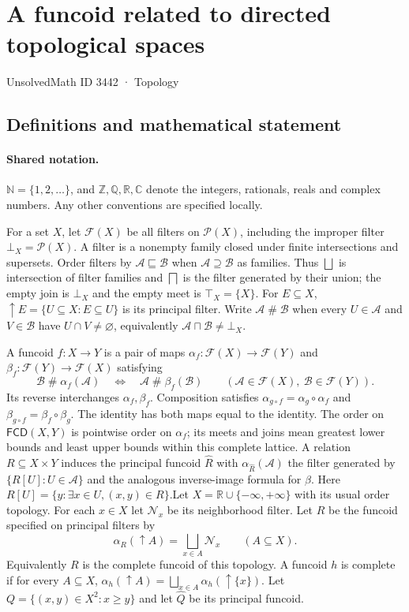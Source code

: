 \documentclass[11pt]{article}
\begin{document}
\setcounter{section}{3441}
\section{A funcoid related to directed topological spaces}\label{3442}
{\small\sffamily UnsolvedMath ID 3442 · Topology}
\subsection{Definitions and mathematical statement}

\paragraph{Shared notation.}$\mathbb N=\{1,2,\ldots\}$, and $\mathbb Z,\mathbb Q,\mathbb R,\mathbb C$ denote the integers, rationals, reals and complex numbers. Any other conventions are specified locally.


For a set $X$, let $\mathcal F(X)$ be all filters on $\mathcal P(X)$, including the improper filter $\bot_X=\mathcal P(X)$. A filter is a nonempty family closed under finite intersections and supersets. Order filters by $\mathcal A\sqsubseteq\mathcal B$ when $\mathcal A\supseteq\mathcal B$ as families. Thus $\bigsqcup$ is intersection of filter families and $\bigsqcap$ is the filter generated by their union; the empty join is $\bot_X$ and the empty meet is $\top_X=\{X\}$. For $E\subseteq X$, $\uparrow E=\{U\subseteq X:E\subseteq U\}$ is its principal filter. Write $\mathcal A\mathrel{\#}\mathcal B$ when every $U\in\mathcal A$ and $V\in\mathcal B$ have $U\cap V\ne\varnothing$, equivalently $\mathcal A\sqcap\mathcal B\ne\bot_X$.

A funcoid $f:X\to Y$ is a pair of maps $\alpha_f:\mathcal F(X)\to\mathcal F(Y)$ and $\beta_f:\mathcal F(Y)\to\mathcal F(X)$ satisfying
\[
 \mathcal B\mathrel{\#}\alpha_f(\mathcal A)
 \quad\Longleftrightarrow\quad
 \mathcal A\mathrel{\#}\beta_f(\mathcal B)
 \qquad(\mathcal A\in\mathcal F(X),\ \mathcal B\in\mathcal F(Y)).
\]
Its reverse interchanges $\alpha_f,\beta_f$. Composition satisfies $\alpha_{g\circ f}=\alpha_g\circ\alpha_f$ and $\beta_{g\circ f}=\beta_f\circ\beta_g$. The identity has both maps equal to the identity. The order on $\mathsf{FCD}(X,Y)$ is pointwise order on $\alpha_f$; its meets and joins mean greatest lower bounds and least upper bounds within this complete lattice. A relation $R\subseteq X\times Y$ induces the principal funcoid $\widehat R$ with $\alpha_{\widehat R}(\mathcal A)$ the filter generated by $\{R[U]:U\in\mathcal A\}$ and the analogous inverse-image formula for $\beta$. Here $R[U]=\{y:\exists x\in U,(x,y)\in R\}$.Let $X=\mathbb R\cup\{-\infty,+\infty\}$ with its usual order topology. For each $x\in X$ let $\mathcal N_x$ be its neighborhood filter. Let $R$ be the funcoid specified on principal filters by
\[
 \alpha_R(\uparrow A)=\bigsqcup_{x\in A}\mathcal N_x\qquad(A\subseteq X).
\]
Equivalently $R$ is the complete funcoid of this topology. A funcoid $h$ is complete if for every $A\subseteq X$, $\alpha_h(\uparrow A)=\bigsqcup_{x\in A}\alpha_h(\uparrow\{x\})$. Let $Q=\{(x,y)\in X^2:x\ge y\}$ and let $\widehat Q$ be its principal funcoid.
\end{document}
